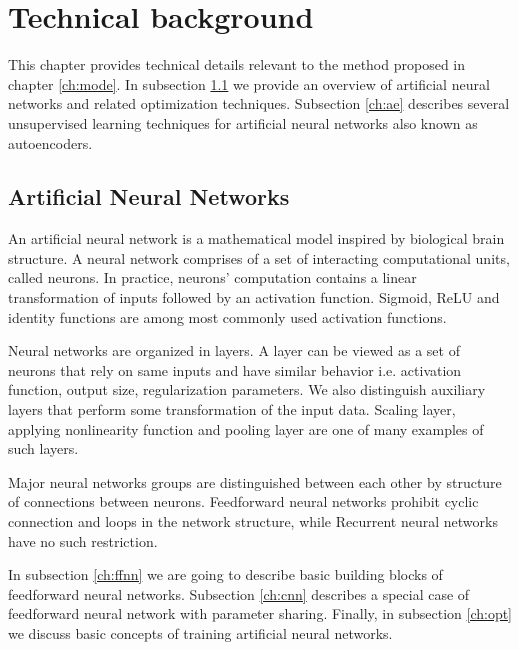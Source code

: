 
\chapter{Technical background}
\label{ch:tede}

This chapter provides technical details relevant to the method proposed in chapter \ref{ch:mode}.
In subsection \ref{ch:nn} we provide an overview of artificial neural networks and related optimization techniques.
Subsection \ref{ch:ae} describes several unsupervised learning techniques for artificial neural networks also known as autoencoders.

\section{Artificial Neural Networks}
\label{ch:nn}
An artificial neural network is a mathematical model inspired by biological brain structure.
A neural network comprises of a set of interacting computational units, called neurons.
In practice, neurons' computation contains a linear transformation of inputs followed by an activation function.
Sigmoid, ReLU and identity functions are among most commonly used activation functions.

Neural networks are organized in layers.
A layer can be viewed as a set of neurons that rely on same inputs and have similar behavior i.e. activation function, output size, regularization parameters.
We also distinguish auxiliary layers that perform some transformation of the input data.
Scaling layer, applying nonlinearity function and pooling layer are one of many examples of such layers.

Major neural networks groups are distinguished between each other by structure of connections between neurons.
Feedforward neural networks prohibit cyclic connection and loops in the network structure, while Recurrent neural networks have no such restriction.

In subsection \ref{ch:ffnn} we are going to describe basic building blocks of feedforward neural networks.
Subsection \ref{ch:cnn} describes a special case of feedforward neural network with parameter sharing.
Finally, in subsection \ref{ch:opt} we discuss basic concepts of training artificial neural networks.

